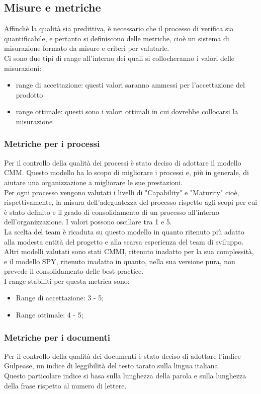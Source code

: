 	\subsection{Misure e metriche}
	Affinchè la qualità sia predittiva, è necessario che il processo di verifica sia quantificabile, e pertanto si definiscono delle metriche, cioè un sistema di misurazione formato da misure e criteri per valutarle.\\
	Ci sono due tipi di range all'interno dei quali si collocheranno i valori delle misurazioni:
	\begin{itemize}
		\item range di accettazione: questi valori saranno ammessi per l'accettazione del prodotto
		\item range ottimale: questi sono i valori ottimali in cui dovrebbe collocarsi la misurazione
	\end{itemize}
	\subsubsection{Metriche per i processi}
		Per il controllo della qualità dei processi è stato deciso di adottare il modello CMM. Questo modello ha lo scopo di migliorare i processi e, più in generale, di aiutare una organizzazione a migliorare le sue prestazioni.\\
		Per ogni processo vengono valutati i livelli di "Capability" e "Maturity" cioè, rispettivamente, la misura dell'adeguatezza del processo  rispetto agli scopi per cui è stato definito e il grado di consolidamento di un processo all'interno dell'organizzazione. I valori possono oscillare tra 1 e 5.\\
		La scelta del team è ricaduta su questo modello in quanto ritenuto più adatto alla modesta entità del progetto e alla scarsa esperienza del team di sviluppo. Altri modelli valutati sono stati CMMI, ritenuto inadatto per la sua complessità, e il modello SPY, ritenuto inadatto in quanto, nella sua versione pura, non prevede il consolidamento delle best practice.\\
		I range stabiliti per questa metrica sono:
		\begin{itemize}
			\item Range di accettazione: 3 - 5;
			\item Range ottimale: 4 - 5;
		\end{itemize}	
	\subsubsection{Metriche per i documenti}
		Per il controllo della qualità dei documenti è stato deciso di adottare l'indice Gulpease, un indice di leggibilità del testo tarato sulla lingua italiana.\\
		Questo particolare indice si basa sulla lunghezza della parola e sulla lunghezza della frase rispetto al numero di lettere.\\
		
